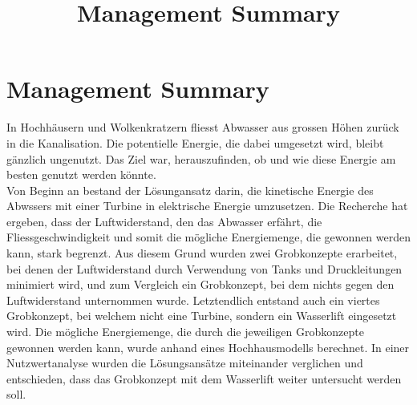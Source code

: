 \documentclass[12pt]{article}
\title{Management Summary}
\begin{document}
\section*{Management Summary}
In Hochhäusern und Wolkenkratzern fliesst Abwasser aus grossen Höhen zurück in die Kanalisation. Die potentielle Energie, die dabei umgesetzt wird, bleibt gänzlich ungenutzt. Das Ziel war, herauszufinden, ob und wie diese Energie am besten genutzt werden könnte. \\


Von Beginn an bestand der Lösungansatz darin, die kinetische Energie des Abwssers mit einer Turbine in elektrische Energie umzusetzen. Die Recherche hat ergeben, dass der Luftwiderstand, den das Abwasser erfährt, die Fliessgeschwindigkeit und somit die mögliche Energiemenge, die gewonnen werden kann, stark begrenzt. Aus diesem Grund wurden zwei Grobkonzepte erarbeitet, bei denen der Luftwiderstand durch Verwendung von Tanks und Druckleitungen minimiert wird, und zum Vergleich ein Grobkonzept, bei dem nichts gegen den Luftwiderstand unternommen wurde. Letztendlich entstand auch ein viertes Grobkonzept, bei welchem nicht eine Turbine, sondern ein Wasserlift eingesetzt wird. Die mögliche Energiemenge, die durch die jeweiligen Grobkonzepte gewonnen werden kann, wurde anhand eines Hochhausmodells berechnet. In einer Nutzwertanalyse wurden die Lösungsansätze miteinander verglichen und entschieden, dass das Grobkonzept mit dem Wasserlift weiter untersucht werden soll.\\
\end{document}
